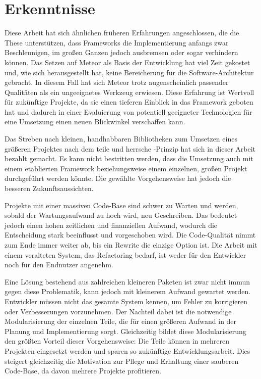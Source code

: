 \section{Erkenntnisse}
\label{sec:d_erkenntnisse}

Diese Arbeit hat sich ähnlichen früheren Erfahrungen angeschlossen, die die
These unterstützen, dass Frameworks die Implementierung anfangs zwar
Beschleunigen, im großen Ganzen jedoch ausbremsen oder sogar verhindern können.
Das Setzen auf Meteor als Basis der Entwicklung hat viel Zeit gekostet und, wie
sich herausgestellt hat, keine Bereicherung für die Software-Architektur
gebracht.  In diesem Fall hat sich Meteor trotz augenscheinlich passender
Qualitäten als ein ungeeignetes Werkzeug erwiesen.  Diese Erfahrung ist
Wertvoll für zukünftige Projekte, da sie einen tieferen Einblick in das
Framework geboten hat und dadurch in einer Evaluierung von potentiell geeigneter
Technologien für eine Umsetzung einen neuen Blickwinkel verschaffen kann.

Das Streben nach kleinen, handhabbaren Bibliotheken zum Umsetzen eines
größeren Projektes nach dem teile und herrsche -Prinzip hat sich in dieser
Arbeit bezahlt gemacht.  Es kann nicht bestritten werden, dass die Umsetzung
auch mit einem etablierten Framework beziehungsweise einem einzelnen, großen
Projekt durchgeführt werden könnte.  Die gewählte Vorgehensweise hat jedoch
die besseren Zukunftsaussichten.

Projekte mit einer massiven Code-Base sind schwer zu Warten und werden, sobald
der Wartungsaufwand zu hoch wird, neu Geschreiben.  Das bedeutet jedoch einen
hohen zeitlichen und finanziellen Aufwand, wodurch die Entscheidung stark
beeinflusst und vorgeschoben wird.  Die Code-Qualität nimmt zum Ende immer
weiter ab, bis ein Rewrite die einzige Option ist.  Die Arbeit mit einem
veralteten System, das Refactoring bedarf, ist weder für den Entwickler noch
für den Endnutzer angenehm.

Eine Lösung bestehend aus zahlreichen kleineren Paketen ist zwar nicht immun
gegen diese Problematik, kann jedoch mit kleinerem Aufwand gewartet werden.
Entwickler müssen nicht das gesamte System kennen, um Fehler zu korrigieren
oder Verbesserungen vorzunehmen.  Der Nachteil dabei ist die notwendige
Modularisierung der einzelnen Teile, die für einen größeren Aufwand in der
Planung und Implementierung sorgt.  Gleichzeitig bildet diese Modularisierung
den größten Vorteil dieser Vorgehensweise:  Die Teile können in mehreren
Projekten eingesetzt werden und sparen so zukünftige Entwicklungsarbeit.
Dies steigert gleichzeitig die Motivation zur Pflege und Erhaltung einer
sauberen Code-Base, da davon mehrere Projekte profitieren.

